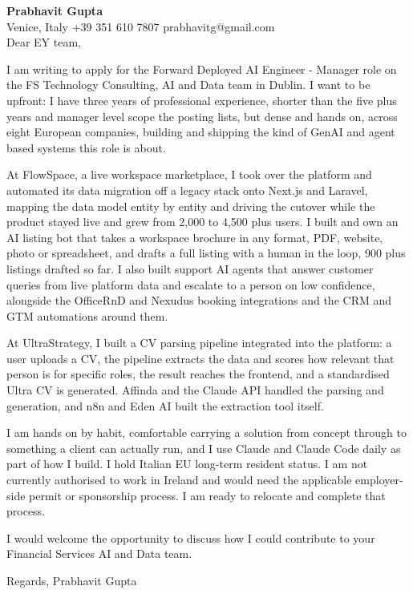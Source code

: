 \documentclass[a4paper,10.5pt]{article}
\begin{document}
\textbf{Prabhavit Gupta}\\
Venice, Italy \textbar{} +39 351 610 7807 \textbar{} prabhavitg@gmail.com\\[10pt]
Dear EY team,

I am writing to apply for the Forward Deployed AI Engineer - Manager role on the FS Technology Consulting, AI and Data team in Dublin. I want to be upfront: I have three years of professional experience, shorter than the five plus years and manager level scope the posting lists, but dense and hands on, across eight European companies, building and shipping the kind of GenAI and agent based systems this role is about.

At FlowSpace, a live workspace marketplace, I took over the platform and automated its data migration off a legacy stack onto Next.js and Laravel, mapping the data model entity by entity and driving the cutover while the product stayed live and grew from 2,000 to 4,500 plus users. I built and own an AI listing bot that takes a workspace brochure in any format, PDF, website, photo or spreadsheet, and drafts a full listing with a human in the loop, 900 plus listings drafted so far. I also built support AI agents that answer customer queries from live platform data and escalate to a person on low confidence, alongside the OfficeRnD and Nexudus booking integrations and the CRM and GTM automations around them.

At UltraStrategy, I built a CV parsing pipeline integrated into the platform: a user uploads a CV, the pipeline extracts the data and scores how relevant that person is for specific roles, the result reaches the frontend, and a standardised Ultra CV is generated. Affinda and the Claude API handled the parsing and generation, and n8n and Eden AI built the extraction tool itself.

I am hands on by habit, comfortable carrying a solution from concept through to something a client can actually run, and I use Claude and Claude Code daily as part of how I build. I hold Italian EU long-term resident status. I am not currently authorised to work in Ireland and would need the applicable employer-side permit or sponsorship process. I am ready to relocate and complete that process.

I would welcome the opportunity to discuss how I could contribute to your Financial Services AI and Data team.

Regards,
Prabhavit Gupta
\end{document}
